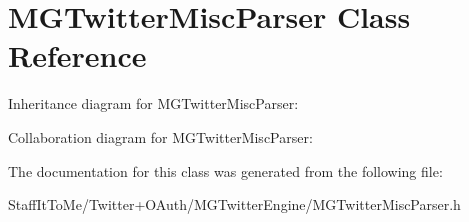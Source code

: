 \hypertarget{interface_m_g_twitter_misc_parser}{
\section{\-M\-G\-Twitter\-Misc\-Parser \-Class \-Reference}
\label{interface_m_g_twitter_misc_parser}
}


\-Inheritance diagram for \-M\-G\-Twitter\-Misc\-Parser\-:


\-Collaboration diagram for \-M\-G\-Twitter\-Misc\-Parser\-:


\-The documentation for this class was generated from the following file\-:\begin{DoxyCompactItemize}
\item 
\-Staff\-It\-To\-Me/\-Twitter+\-O\-Auth/\-M\-G\-Twitter\-Engine/\-M\-G\-Twitter\-Misc\-Parser.\-h\end{DoxyCompactItemize}
